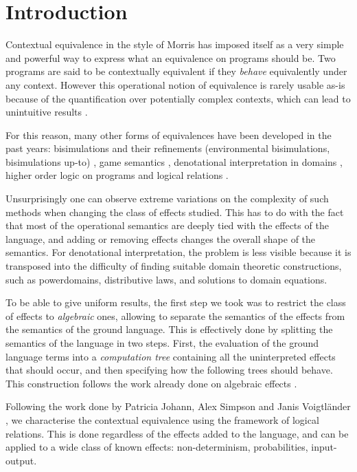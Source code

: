 \section{Introduction}


Contextual equivalence in the style of Morris
has imposed itself as a very simple and powerful
way to express what an equivalence on programs should be. 
Two programs are said to be contextually equivalent if 
they \emph{behave} equivalently under any context. 
However this operational notion of equivalence is rarely usable 
as-is because of the quantification over potentially complex 
contexts, which can lead to unintuitive results \cite{pitts1997operationally}.

For this reason, many other forms of equivalences have 
been developed in the past years: bisimulations 
and their refinements (environmental bisimulations, 
bisimulations up-to) \cite{koutavas2011applicative}, 
game semantics \cite{abramsky1999game}, 
denotational interpretation in domains \cite{scott1982domains}, 
higher order logic on 
programs \cite{honda2005observationally} 
and logical relations \cite{Pitts2000}.

Unsurprisingly one can observe extreme variations on 
the complexity of such methods when changing  
the class of effects studied. This has to do with 
the fact that most of the operational semantics 
are deeply tied with the effects of the language, 
and adding or removing effects changes the overall 
shape of the semantics. For denotational interpretation,
the problem is less visible because it is transposed 
into the difficulty of finding suitable domain theoretic constructions, 
such as powerdomains, distributive laws,
and solutions to domain equations.

To be able to give uniform results, the first 
step we took was to restrict the class of effects
to \emph{algebraic} ones, 
allowing to separate the semantics 
of the effects from the semantics of the ground language. 
This is effectively done by splitting the semantics of 
the language in two steps. First, the evaluation 
of the ground language terms into a \emph{computation tree}
containing all the uninterpreted effects that should occur, 
and then specifying how the following trees should behave.
This construction follows the work already done on 
algebraic effects \cite{plotkin2001adequacy}.


Following the work done by Patricia
Johann, Alex Simpson and Janis Voigtl\"ander \cite{gom}, we 
characterise the contextual equivalence using the framework 
of logical relations. This is done regardless of the 
effects added to the language, and can be applied to a wide 
class of known effects: non-determinism, probabilities, input-output.

